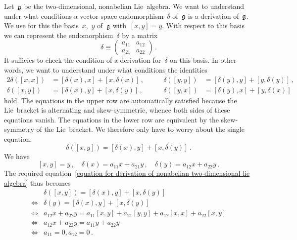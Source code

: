 \begin{example}
	\label{derivations of the two-dimensional non-abelian lie algebra}
	Let~$\mathfrak{g}$ be the two-dimensional, nonabelian Lie~algebra.
	We want to understand under what conditions a vector space endomorphism~$\delta$ of~$\mathfrak{g}$ is a derivation of~$\mathfrak{g}$.
	We use for this the basis~$x$,~$y$ of~$\mathfrak{g}$ with~$[x,y] = y$.
	With respect to this basis we can represent the endomorphism~$\delta$ by a matrix
	\[
		\delta
		\equiv
		\begin{pmatrix}
			a_{11} & a_{12} \\
			a_{21} & a_{22}
		\end{pmatrix} \,.
	\]
	It sufficies to check the condition of a derivation for~$\delta$ on this basis.
	In other words, we want to understand under what conditions the identities
	\begin{alignat*}{2}
		\delta( [x,x] ) &= [ \delta(x), x ] + [ x, \delta(x) ] \,,
		&
		\qquad
		\delta( [y,y] ) &= [ \delta(y), y ] + [ y, \delta(y) ] \,,
		\\
		\delta( [x,y] ) &= [ \delta(x), y ] + [ x, \delta(y) ] \,,
		&
		\qquad
		\delta( [y,x] ) &= [ \delta(y), x ] + [ y, \delta(x) ]
	\end{alignat*}
	hold.
	The equations in the upper row are automatically satisfied because the Lie~bracket is alternating and skew-symmetric, whence both sides of these equations vanish.
	The equations in the lower row are equivalent by the skew-symmetry of the Lie~bracket.
	We therefore only have to worry about the single equation.
	\begin{equation}
		\label{equation for derivation of nonabelian two-dimensional lie algebra}
		\delta( [x,y] )
		=
		[ \delta(x), y ] + [ x, \delta(y) ] \,.
	\end{equation}
	We have
	\[
		[x,y] = y \,,
		\quad
		\delta(x) = a_{11} x + a_{21} y \,,
		\quad
		\delta(y) = a_{12} x + a_{22} y \,.
	\]
	The required equation~\eqref{equation for derivation of nonabelian two-dimensional lie algebra} thus becomes
	\begin{align*}
		{}&
		\delta( [x,y] )
		=
		[ \delta(x), y ] + [ x, \delta(y) ]
		\\
		\iff{}&
		\delta( y )
		=
		[ \delta(x), y ] + [ x, \delta(y) ]
		\\
		\iff{}&
		a_{12} x + a_{22} y
		=
		a_{11} [x,y] + a_{21} [y,y]
		+ a_{12} [x,x] + a_{22} [x,y]
		\\
		\iff{}&
		a_{12} x + a_{22} y
		=
		a_{11} y + a_{22} y
		\\
		\iff{}&
		a_{11} = 0,
		a_{12} = 0 \,.
	\end{align*}


\end{example}
